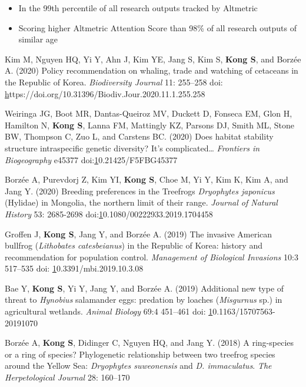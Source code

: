 \documentclass[11pt]{article}
\begin{document}
\begin{etaremune}
	\begin{itemize}\item In the 99th percentile of all research outputs tracked by Altmetric
				\item Scoring higher Altmetric Attention Score than 98\% of all research outputs of similar age \end{itemize}
	
\item Kim M, Nguyen HQ, Yi Y, Ahn J, Kim YE, Jang S, Kim S, \textbf{Kong S}, and Borzée A. (2020) Policy recommendation on whaling, trade and watching of cetaceans in the Republic of Korea. \textit{Biodiversity Journal} 11: 255–258 doi: \href{https://doi.org/10.31396/Biodiv.Jour.2020.11.1.255.258}https://doi.org/10.31396/Biodiv.Jour.2020.11.1.255.258
\item Weiringa JG, Boot MR,  Dantas-Queiroz MV, Duckett D, Fonseca EM, Glon H, Hamilton N, \textbf{Kong S}, Lanna FM, Mattingly KZ, Parsons DJ, Smith ML, Stone BW, Thompson C, Zuo L, and Carstens BC. (2020) Does habitat stability structure intraspecific genetic diversity? It’s complicated… \textit{Frontiers in Biogeography} e45377 doi:\href{https://doi.org/10.21425/F5FBG45377}10.21425/F5FBG45377
\item Borzée A, Purevdorj Z, Kim YI, \textbf{Kong S}, Choe M, Yi Y, Kim K, Kim A, and Jang Y. (2020) Breeding preferences in the Treefrogs \textit{Dryophytes japonicus} (Hylidae) in Mongolia, the northern limit of their range. \textit{Journal of Natural History} 53: 2685-2698 doi:\href{10.1080/00222933.2019.1704458}10.1080/00222933.2019.1704458
\item Groffen J, \textbf{Kong S}, Jang Y, and Borzée A. (2019) The invasive American bullfrog (\textit{Lithobates catesbeianus}) in the Republic of Korea: history and recommendation for population control. \textit{Management of Biological Invasions} 10:3 517–535 doi: \href{10.3391/mbi.2019.10.3.08}10.3391/mbi.2019.10.3.08
\item Bae Y, \textbf{Kong S}, Yi Y, Jang Y, and Borzée A. (2019) Additional new type of threat to \textit{Hynobius} salamander eggs: predation by loaches (\textit{Misgurnus} sp.) in agricultural wetlands. \textit{Animal Biology} 69:4 451–461 doi: \href{https://doi.org/10.1163/15707563-20191070}10.1163/15707563-20191070
\item Borzée A,\textbf{ Kong S}, Didinger C, Nguyen HQ, and Jang Y. (2018) A ring-species or a ring of species? Phylogenetic relationship between two treefrog species around the Yellow Sea: \textit{Dryophytes suweonensis }and \textit{D. immaculatus}. \textit{The Herpetological Journal} 28: 160–170 

\end{etaremune}
\end{document}
